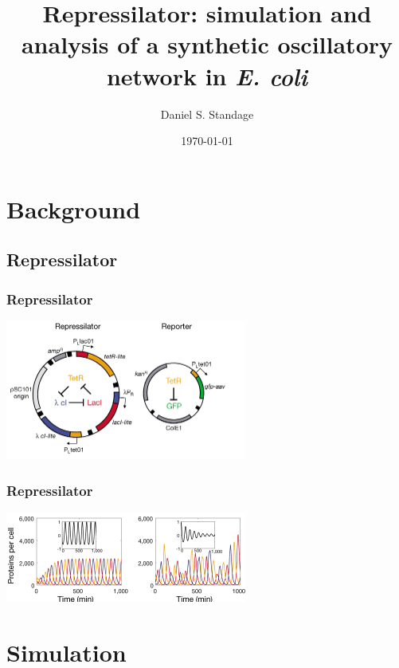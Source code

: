 \documentclass{beamer}
\title[Repressilator]{Repressilator: simulation and analysis of a synthetic oscillatory network in \textit{E. coli}}
\author{Daniel S. Standage}
\date{\today}
\institute[BCB 570]{BCB 570}
\begin{document}
 

\begin{frame}
  \titlepage
\end{frame}

\section{Background}
\subsection{Repressilator}
\begin{frame}
  \frametitle{Repressilator}
  \begin{center}
    \includegraphics[width=300px]{../repressilator.png}
  \end{center}
\end{frame}
\begin{frame}
  \frametitle{Repressilator}
  \begin{center}
    \includegraphics[width=300px]{../simulation.png}
  \end{center}
\end{frame}

\section{Simulation}
\end{document}
